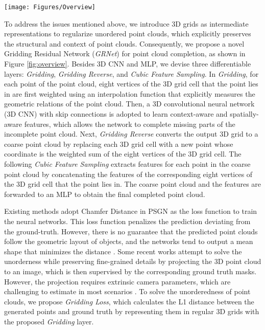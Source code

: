 \documentclass[runningheads]{llncs}
\begin{document}
\begin{figure*}[!t]
  \resizebox{\linewidth}{!} {
    \texttt{[image: Figures/Overview]}
  }
  \caption{Overview of the proposed {\bf (a)} GRNet, {\bf (b)} Gridding, {\bf (c)} Gridding Reverse, {\bf (d)} Cubic Feature Sampling, and {\bf (e)} Gridding Loss.}
  \label{fig:overview}
\end{figure*}

To address the issues mentioned above, we introduce 3D grids as intermediate representations to regularize unordered point clouds, which explicitly preserves the structural and context of point clouds.
Consequently, we propose a novel Gridding Residual Network ({\it GRNet}) for point cloud completion, as shown in Figure \ref{fig:overview}.
Besides 3D CNN and MLP, we devise three differentiable layers: {\it Gridding}, {\it Gridding Reverse}, and {\it Cubic Feature Sampling}.
In {\it Gridding}, for each point of the point cloud, eight vertices of the 3D grid cell that the point lies in are first weighted using an interpolation function that explicitly measures the geometric relations of the point cloud.
Then, a 3D convolutional neural network (3D CNN) with skip connections is adopted to learn context-aware and spatially-aware features, which allows the network to complete missing parts of the incomplete point cloud.
Next, {\it Gridding Reverse} converts the output 3D grid to a coarse point cloud by replacing each 3D grid cell with a new point whose coordinate is the weighted sum of the eight vertices of the 3D grid cell.
The following {\it Cubic Feature Sampling} extracts features for each point in the coarse point cloud by concatenating the features of the corresponding eight vertices of the 3D grid cell that the point lies in.
The coarse point cloud and the features are forwarded to an MLP to obtain the final completed point cloud. 

Existing methods adopt Chamfer Distance in PSGN \cite{DBLP:conf/cvpr/FanSG17} as the loss function to train the neural networks.
This loss function penalizes the prediction deviating from the ground-truth.
However, there is no guarantee that the predicted point clouds follow the geometric layout of objects, and the networks tend to output a mean shape that minimizes the distance \cite{DBLP:conf/eccv/JiangSQJ18,DBLP:conf/nips/XuWCMN19}.
Some recent works \cite{DBLP:conf/eccv/JiangSQJ18,DBLP:conf/nips/XuWCMN19,DBLP:conf/nips/KarHM17,DBLP:conf/eccv/LiPZR18,DBLP:conf/aaai/LinKL18} attempt to solve the unorderness while preserving fine-grained details by projecting the 3D point cloud to an image, which is then supervised by the corresponding ground truth masks.
However, the projection requires extrinsic camera parameters, which are challenging to estimate in most scenarios \cite{DBLP:conf/cvpr/PengLHZB19}.
To solve the unorderedness of point clouds, we propose {\it Gridding Loss}, which calculates the L1 distance between the generated points and ground truth by representing them in regular 3D grids with the proposed {\it Gridding} layer.
\end{document}
